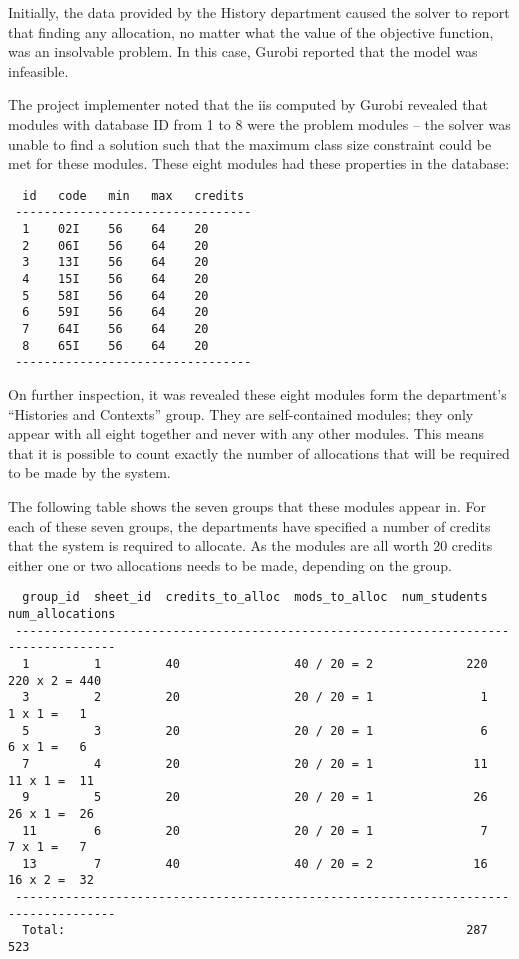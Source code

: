 Initially, the data provided by the History department caused the solver to
report that finding any allocation, no matter what the value of the objective
function, was an insolvable problem. In this case, Gurobi reported that the
model was infeasible.

The project implementer noted that the \gls{iis} computed by Gurobi revealed
that modules with database ID from 1 to 8 were the problem modules -- the
solver was unable to find a solution such that the maximum class size
constraint could be met for these modules. These eight modules had these
properties in the database:

\begin{verbatim}
  id   code   min   max   credits
 ---------------------------------
  1    02I    56    64    20
  2    06I    56    64    20
  3    13I    56    64    20
  4    15I    56    64    20
  5    58I    56    64    20
  6    59I    56    64    20
  7    64I    56    64    20
  8    65I    56    64    20
 ---------------------------------
\end{verbatim}

On further inspection, it was revealed these eight modules form the
department's ``Histories and Contexts'' group. They are self-contained
modules; they only appear with all eight together and never with any other
modules. This means that it is possible to count exactly the number of
allocations that will be required to be made by the system.

The following table shows the seven groups that these modules appear in. For
each of these seven groups, the departments have specified a number of credits
that the system is required to allocate. As the modules are all worth 20
credits either one or two allocations needs to be made, depending on the
group.

\begin{verbatim}
  group_id  sheet_id  credits_to_alloc  mods_to_alloc  num_students  num_allocations
 ------------------------------------------------------------------------------------
  1         1         40                40 / 20 = 2             220    220 x 2 = 440
  3         2         20                20 / 20 = 1               1      1 x 1 =   1
  5         3         20                20 / 20 = 1               6      6 x 1 =   6
  7         4         20                20 / 20 = 1              11     11 x 1 =  11
  9         5         20                20 / 20 = 1              26     26 x 1 =  26
  11        6         20                20 / 20 = 1               7      7 x 1 =   7
  13        7         40                40 / 20 = 2              16     16 x 2 =  32
 ------------------------------------------------------------------------------------
  Total:                                                        287              523
\end{verbatim}

